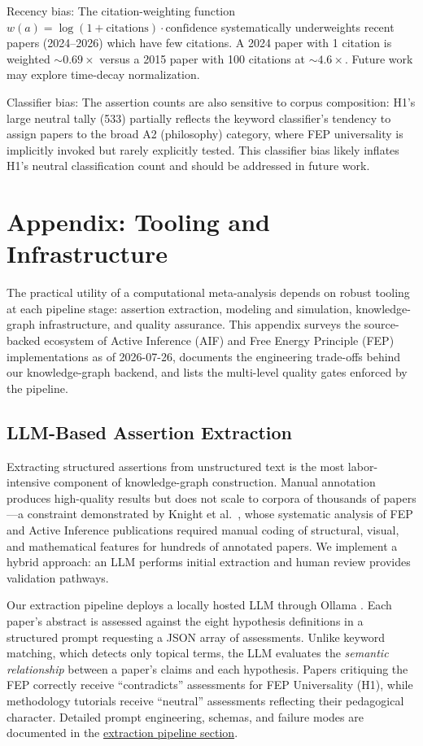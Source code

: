 \documentclass[
  english,
]{article}
\begin{document}
Recency bias: The citation-weighting function
\(w(a) = \log(1+\text{citations})\cdot\text{confidence}\) systematically
underweights recent papers (2024--2026) which have few citations. A 2024
paper with 1 citation is weighted \(\sim0.69\times\) versus a 2015 paper
with 100 citations at \(\sim4.6\times\). Future work may explore
time-decay normalization.

Classifier bias: The assertion counts are also sensitive to corpus
composition: H1's large neutral tally (533) partially reflects the
keyword classifier's tendency to assign papers to the broad A2
(philosophy) category, where FEP universality is implicitly invoked but
rarely explicitly tested. This classifier bias likely inflates H1's
neutral classification count and should be addressed in future work.

\newpage

\section{Appendix: Tooling and Infrastructure}\label{sec:tooling}

The practical utility of a computational meta-analysis depends on robust
tooling at each pipeline stage: assertion extraction, modeling and
simulation, knowledge-graph infrastructure, and quality assurance. This
appendix surveys the source-backed ecosystem of Active Inference (AIF)
and Free Energy Principle (FEP) implementations as of 2026-07-26,
documents the engineering trade-offs behind our knowledge-graph backend,
and lists the multi-level quality gates enforced by the pipeline.

\subsection{LLM-Based Assertion
Extraction}\label{llm-based-assertion-extraction-1}

Extracting structured assertions from unstructured text is the most
labor-intensive component of knowledge-graph construction. Manual
annotation produces high-quality results but does not scale to corpora
of thousands of papers---a constraint demonstrated by Knight et
al.~\citep{knight2022fep}, whose systematic analysis of FEP and Active
Inference publications required manual coding of structural, visual, and
mathematical features for hundreds of annotated papers. We implement a
hybrid approach: an LLM performs initial extraction and human review
provides validation pathways.

Our extraction pipeline deploys a locally hosted LLM through Ollama
\citep{ollama2024}. Each paper's abstract is assessed against the eight
hypothesis definitions in a structured prompt requesting a JSON array of
assessments. Unlike keyword matching, which detects only topical terms,
the LLM evaluates the \emph{semantic relationship} between a paper's
claims and each hypothesis. Papers critiquing the FEP correctly receive
``contradicts'' assessments for FEP Universality (H1), while methodology
tutorials receive ``neutral'' assessments reflecting their pedagogical
character. Detailed prompt engineering, schemas, and failure modes are
documented in the
\hyperref[sec:extraction_pipeline]{extraction pipeline section}.
\end{document}
